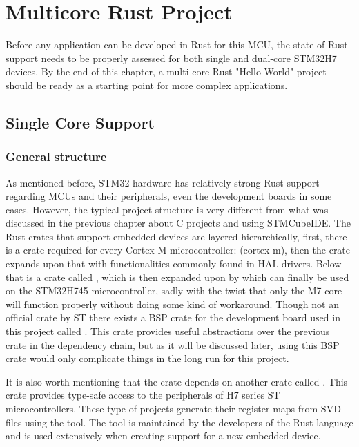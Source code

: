 \chapter{Multicore Rust Project}

Before any application can be developed in Rust for this MCU, the state of Rust support needs to be properly assessed for both single and dual-core STM32H7 devices. By the end of this chapter, a multi-core Rust "Hello World" project should be ready as a starting point for more complex applications.

\section{Single Core Support}

\subsection{General structure}

As mentioned before, STM32 hardware has relatively strong Rust support regarding MCUs and their peripherals, even the development boards in some cases. However, the typical project structure is very different from what was discussed in the previous chapter about C projects and using STMCubeIDE. The Rust crates that support embedded devices are layered hierarchically, first, there is a crate required for every Cortex-M microcontroller: \mycode(cortex-m), then the  crate expands upon that with functionalities commonly found in HAL drivers. Below that is a crate called , which is then expanded upon by  which can finally be used on the STM32H745 microcontroller, sadly with the twist that only the M7 core will function properly without doing some kind of workaround. Though not an official crate by ST there exists a BSP crate for the development board used in this project called . This crate provides useful abstractions over the previous crate in the dependency chain, but as it will be discussed later, using this BSP crate would only complicate things in the long run for this project.

It is also worth mentioning that the  crate depends on another crate called . This crate provides type-safe access to the peripherals of H7 series ST microcontrollers. These type of projects generate their register maps from SVD files using the  tool. The tool is maintained by the developers of the Rust language and is used extensively when creating support for a new embedded device.

